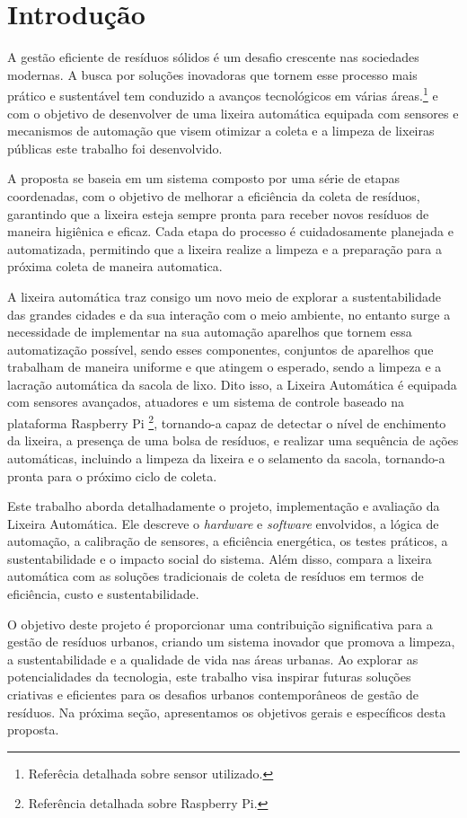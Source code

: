 \section{Introdução} \label{sec:Intro}
A gestão eficiente de resíduos sólidos é um desafio crescente nas sociedades modernas. A busca por soluções inovadoras que tornem esse processo mais prático e sustentável tem conduzido a avanços tecnológicos em várias áreas.\cite{sensor}\footnote{Referêcia detalhada sobre sensor utilizado.} e com o objetivo de desenvolver
de uma lixeira automática equipada com sensores  e mecanismos de automação que visem otimizar a coleta e a limpeza de lixeiras públicas este trabalho foi desenvolvido.

A proposta se baseia em um sistema composto por uma série de etapas coordenadas, com o objetivo de melhorar a eficiência da coleta de resíduos, garantindo que a lixeira esteja sempre pronta para receber novos resíduos de maneira higiênica e eficaz. Cada etapa do processo é cuidadosamente planejada e automatizada, permitindo que a lixeira realize a limpeza e a preparação para a próxima coleta de maneira automatica.

A lixeira automática traz consigo um novo meio de explorar a sustentabilidade das grandes cidades e da sua interação com o meio ambiente, no entanto surge a necessidade de implementar na sua automação aparelhos que tornem essa automatização possível, sendo esses componentes, conjuntos de aparelhos que trabalham de maneira uniforme e que atingem o esperado, sendo a limpeza e a lacração automática da sacola de lixo. Dito isso, a Lixeira Automática é equipada com sensores avançados, atuadores e um sistema de controle baseado na plataforma Raspberry Pi \cite{raspberry}\footnote{Referência detalhada sobre Raspberry Pi.}, tornando-a capaz de detectar o nível de enchimento da lixeira, a presença de uma bolsa de resíduos, e realizar uma sequência de ações automáticas, incluindo a limpeza da lixeira e o selamento da sacola, tornando-a pronta para o próximo ciclo de coleta.

Este trabalho aborda detalhadamente o projeto, implementação e avaliação da Lixeira Automática. Ele descreve o \textit{hardware} e \textit{software} envolvidos, a lógica de automação, a calibração de sensores, a eficiência energética, os testes práticos, a sustentabilidade e o impacto social do sistema. Além disso, compara a lixeira automática com as soluções tradicionais de coleta de resíduos em termos de eficiência, custo e sustentabilidade.

O objetivo deste projeto é proporcionar uma contribuição significativa para a gestão de resíduos urbanos, criando um sistema inovador que promova a limpeza, a sustentabilidade e a qualidade de vida nas áreas urbanas. Ao explorar as potencialidades da tecnologia, este trabalho visa inspirar futuras soluções criativas e eficientes para os desafios urbanos contemporâneos de gestão de resíduos. Na próxima seção, apresentamos os objetivos gerais e específicos desta proposta.


